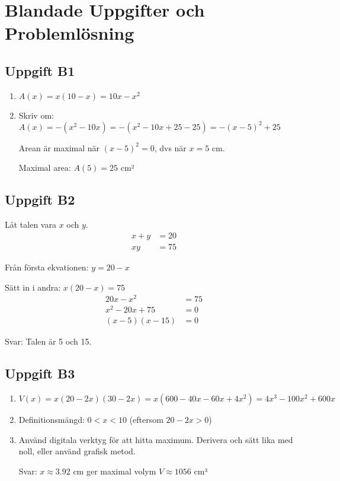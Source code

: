 \documentclass[12pt]{article}
\begin{document}
\newpage

\section{Blandade Uppgifter och Problemlösning}

\subsection*{Uppgift B1}
\begin{enumerate}[label=\alph*)]
    \item $A(x) = x(10 - x) = 10x - x^2$
    \item Skriv om: $A(x) = -(x^2 - 10x) = -(x^2 - 10x + 25 - 25) = -(x - 5)^2 + 25$
    
    Arean är maximal när $(x - 5)^2 = 0$, dvs när $x = 5$ cm.
    
    Maximal area: $A(5) = 25$ cm²
\end{enumerate}

\subsection*{Uppgift B2}
Låt talen vara $x$ och $y$.
\begin{align*}
x + y &= 20 \\
xy &= 75
\end{align*}

Från första ekvationen: $y = 20 - x$

Sätt in i andra: $x(20 - x) = 75$
\begin{align*}
20x - x^2 &= 75 \\
x^2 - 20x + 75 &= 0 \\
(x - 5)(x - 15) &= 0
\end{align*}

Svar: Talen är 5 och 15.

\subsection*{Uppgift B3}
\begin{enumerate}[label=\alph*)]
    \item $V(x) = x(20 - 2x)(30 - 2x) = x(600 - 40x - 60x + 4x^2) = 4x^3 - 100x^2 + 600x$
    \item Definitionsmängd: $0 < x < 10$ (eftersom $20 - 2x > 0$)
    \item Använd digitala verktyg för att hitta maximum. Derivera och sätt lika med noll, eller använd grafisk metod.
    
    Svar: $x \approx 3.92$ cm ger maximal volym $V \approx 1056$ cm³
\end{enumerate}
\end{document}

